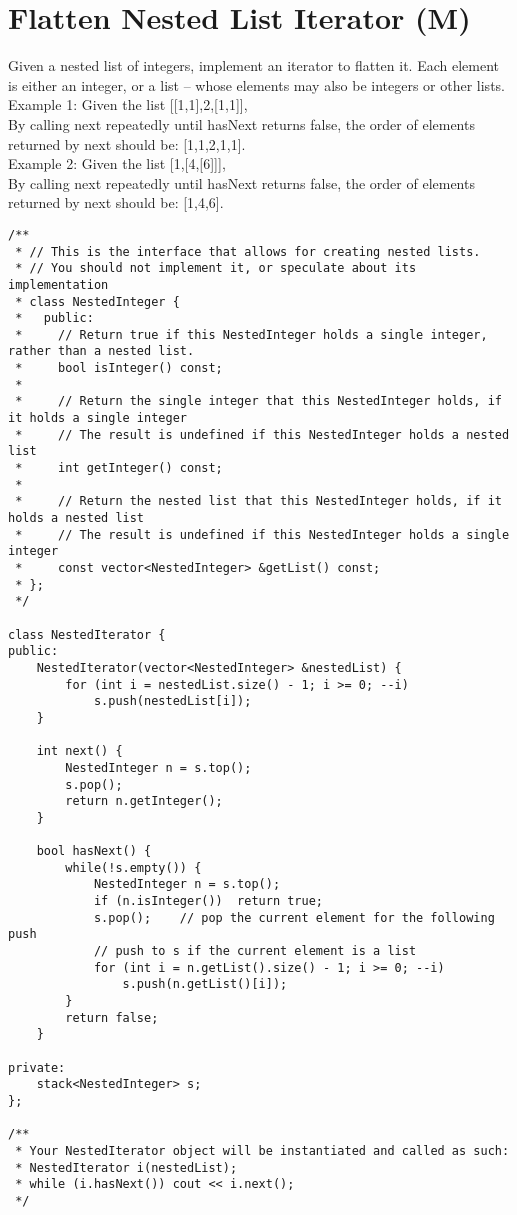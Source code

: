 \section{Flatten Nested List Iterator (M)}
Given a nested list of integers, implement an iterator to flatten it. Each element is either an integer, or a list -- whose elements may also be integers or other lists.\\

Example 1: Given the list [[1,1],2,[1,1]],\\
By calling next repeatedly until hasNext returns false, the order of elements returned by next should be: [1,1,2,1,1].\\

Example 2: Given the list [1,[4,[6]]],\\
By calling next repeatedly until hasNext returns false, the order of elements returned by next should be: [1,4,6]. \\
 
\begin{lstlisting}
/**
 * // This is the interface that allows for creating nested lists.
 * // You should not implement it, or speculate about its implementation
 * class NestedInteger {
 *   public:
 *     // Return true if this NestedInteger holds a single integer, rather than a nested list.
 *     bool isInteger() const;
 *
 *     // Return the single integer that this NestedInteger holds, if it holds a single integer
 *     // The result is undefined if this NestedInteger holds a nested list
 *     int getInteger() const;
 *
 *     // Return the nested list that this NestedInteger holds, if it holds a nested list
 *     // The result is undefined if this NestedInteger holds a single integer
 *     const vector<NestedInteger> &getList() const;
 * };
 */
 
class NestedIterator {
public:
    NestedIterator(vector<NestedInteger> &nestedList) {
        for (int i = nestedList.size() - 1; i >= 0; --i)
            s.push(nestedList[i]);
    }

    int next() {
        NestedInteger n = s.top();
        s.pop();
        return n.getInteger();
    }

    bool hasNext() {
        while(!s.empty()) {
            NestedInteger n = s.top();
            if (n.isInteger())  return true;
            s.pop();    // pop the current element for the following push
            // push to s if the current element is a list
            for (int i = n.getList().size() - 1; i >= 0; --i)   
                s.push(n.getList()[i]);
        }
        return false;
    }
    
private:
    stack<NestedInteger> s;
};

/**
 * Your NestedIterator object will be instantiated and called as such:
 * NestedIterator i(nestedList);
 * while (i.hasNext()) cout << i.next();
 */
\end{lstlisting}



